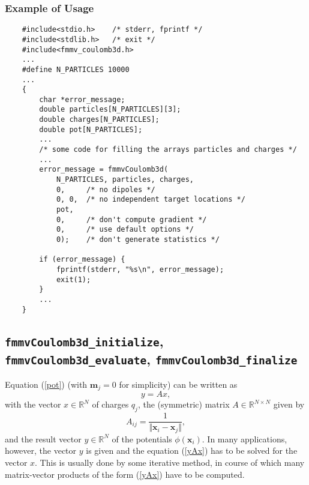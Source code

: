 \subsubsection*{Example of Usage}
\begin{verbatim}
    #include<stdio.h>    /* stderr, fprintf */
    #include<stdlib.h>   /* exit */
    #include<fmmv_coulomb3d.h>
    ...
    #define N_PARTICLES 10000
    ...
    {
        char *error_message;
        double particles[N_PARTICLES][3];
        double charges[N_PARTICLES];
        double pot[N_PARTICLES];
        ...
        /* some code for filling the arrays particles and charges */
        ...
        error_message = fmmvCoulomb3d(
            N_PARTICLES, particles, charges,
            0, 	   /* no dipoles */
            0, 0,  /* no independent target locations */
            pot,   
            0,     /* don't compute gradient */		
            0,     /* use default options */
            0);    /* don't generate statistics */
	
        if (error_message) {
            fprintf(stderr, "%s\n", error_message);
            exit(1);
        }	
        ...
    }
\end{verbatim}

\subsection{{\tt fmmvCoulomb3d\_initialize},
{\tt fmmvCoulomb3d\_evaluate}, %
{\tt fmmvCoulomb3d\_finalize} }\label{in_ev_fi}
Equation (\ref{pot}) (with $\mathbf{m}_j=0$ for simplicity) can be written as 
\begin{equation}\label{yAx}
	y=Ax,
\end{equation}
with the vector $x\in\mathbb{R}^{N}$ of charges $q_j$, the (symmetric) matrix $A\in\mathbb{R}^{N\times N}$ given by
\begin{equation}
	A_{ij} = \frac{1}{\Vert\mathbf{x}_i-\mathbf{x}_j\Vert},
\end{equation}
and the result vector $y\in\mathbb{R}^{N}$ of the potentials $\phi(\mathbf{x}_i)$.
In many applications, however, the vector $y$ is given and the equation (\ref{yAx}) has to
be solved for the vector $x$.
This is usually done by some iterative method, in course of which many matrix-vector products of the form
(\ref{yAx}) have to be computed.

